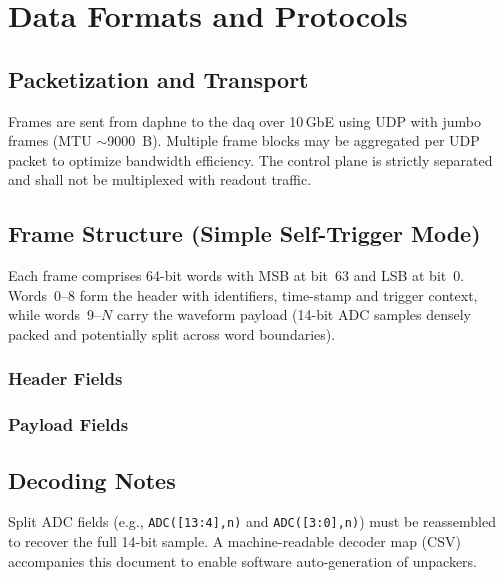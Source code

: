 
\section{Data Formats and Protocols}
\label{sec:dataformats}

\subsection{Packetization and Transport}
Frames are sent from \gls{daphne} to the \gls{daq} over 10\,GbE using UDP with jumbo frames (MTU $\sim$9000~B).
Multiple frame blocks may be aggregated per UDP packet to optimize bandwidth efficiency. The control plane is strictly
separated and shall not be multiplexed with readout traffic.

\subsection{Frame Structure (Simple Self-Trigger Mode)}
Each frame comprises 64-bit words with MSB at bit~63 and LSB at bit~0. Words~0--8 form the header with identifiers,
time-stamp and trigger context, while words~9--$N$ carry the waveform payload (14-bit ADC samples densely packed and
potentially split across word boundaries).

\subsubsection{Header Fields}


\subsubsection{Payload Fields}


\subsection{Decoding Notes}
Split ADC fields (e.g., \texttt{ADC([13:4],n)} and \texttt{ADC([3:0],n)}) must be reassembled to recover the full 14-bit
sample. A machine-readable decoder map (CSV) accompanies this document to enable software auto-generation of unpackers.
